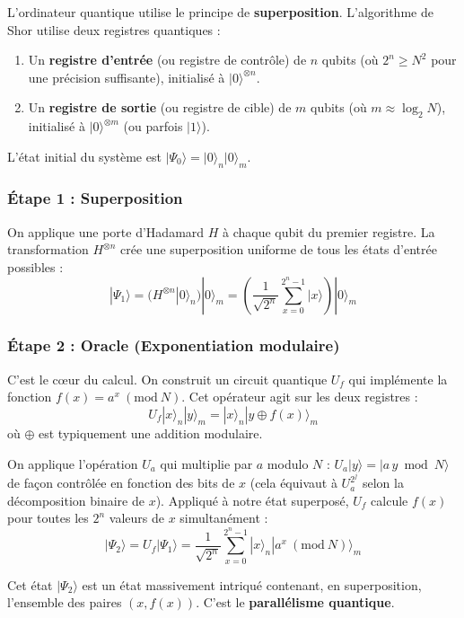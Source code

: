 \documentclass[11pt,a4paper]{article}
\newcommand{\Mod}[1]{\ (\mathrm{mod}\ #1)}
\begin{document}
L'ordinateur quantique utilise le principe de \textbf{superposition}. L'algorithme de Shor utilise deux registres quantiques :

\begin{enumerate}
\item Un \textbf{registre d'entrée} (ou registre de contrôle) de $n$ qubits (où $2^n \geq N^2$ pour une précision suffisante), initialisé à $|0\rangle^{\otimes n}$.

\item Un \textbf{registre de sortie} (ou registre de cible) de $m$ qubits (où $m \approx \log_2 N$), initialisé à $|0\rangle^{\otimes m}$ (ou parfois $|1\rangle$).
\end{enumerate}

L'état initial du système est $|\Psi_0\rangle = |0\rangle_n|0\rangle_m$.

\subsubsection*{Étape 1 : Superposition}

On applique une porte d'Hadamard $H$ à chaque qubit du premier registre. La transformation $H^{\otimes n}$ crée une superposition uniforme de tous les états d'entrée possibles :
\[|\Psi_1\rangle = (H^{\otimes n}|0\rangle_n)|0\rangle_m = \left(\frac{1}{\sqrt{2^n}}\sum_{x=0}^{2^n-1}|x\rangle\right)|0\rangle_m\]

\subsubsection*{Étape 2 : Oracle (Exponentiation modulaire)}

C'est le cœur du calcul. On construit un circuit quantique $U_f$ qui implémente la fonction $f(x) = a^x \Mod{N}$. Cet opérateur agit sur les deux registres : 
\[U_f|x\rangle_n|y\rangle_m = |x\rangle_n|y \oplus f(x)\rangle_m\]
où $\oplus$ est typiquement une addition modulaire.

On applique l'opération $U_a$ qui multiplie par $a$ modulo $N$ : $U_a|y\rangle = |a\,y \bmod N\rangle$ de façon contrôlée en fonction des bits de $x$ (cela équivaut à $U_a^{2^j}$ selon la décomposition binaire de $x$). Appliqué à notre état superposé, $U_f$ calcule $f(x)$ pour toutes les $2^n$ valeurs de $x$ simultanément :
\[|\Psi_2\rangle = U_f|\Psi_1\rangle = \frac{1}{\sqrt{2^n}}\sum_{x=0}^{2^n-1}|x\rangle_n|a^x \Mod{N}\rangle_m\]

Cet état $|\Psi_2\rangle$ est un état massivement intriqué contenant, en superposition, l'ensemble des paires $(x, f(x))$. C'est le \textbf{parallélisme quantique}.
\end{document}
